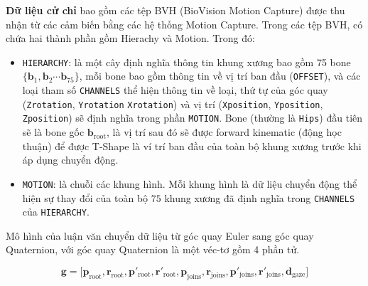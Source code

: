\textbf{Dữ liệu cử chỉ} bao gồm các tệp BVH (BioVision Motion Capture) được thu nhận từ các cảm biến bằng các hệ thống Motion Capture. Trong các tệp BVH, có chứa hai thành phần gồm Hierachy và Motion. Trong đó:

\begin{itemize}
	\item \texttt{HIERARCHY}: là một cây định nghĩa thông tin khung xương bao gồm 75 bone $\{ \mathbf{b}_1, \mathbf{b}_2 \cdots \mathbf{b}_{75} \} $, mỗi bone bao gồm thông tin về vị trí ban đầu (\texttt{OFFSET}), và các loại tham số \texttt{CHANNELS} thể hiện thông tin về loại, thứ tự của góc quay (\texttt{Zrotation}, \texttt{Yrotation} \texttt{Xrotation}) và vị trí (\texttt{Xposition}, \texttt{Yposition}, \texttt{Zposition}) sẽ định nghĩa trong phần \texttt{MOTION}. Bone (thường là \texttt{Hips}) đầu tiên sẽ là bone gốc $\mathbf{b}_{\text{root}}$, là vị trí sau đó sẽ được forward kinematic (động học thuận) để được T-Shape là ví trí ban đầu của toàn bộ khung xương trước khi áp dụng chuyển động.
	
	\item \texttt{MOTION}: là chuỗi các khung hình. Mỗi khung hình là dữ liệu chuyển động thể hiện sự thay đổi của toàn bộ $75$ khung xương đã định nghĩa trong \texttt{CHANNELS} của \texttt{HIERARCHY}.
\end{itemize}


Mô hình của luận văn chuyển dữ liệu từ góc quay Euler sang góc quay Quaternion, với góc quay Quaternion là một véc-tơ gồm 4 phần tử.

\begin{equation} \label{eq:gesturevector}
	\mathbf{g} = \Big[ \mathbf{p}_{\text{root}},  \mathbf{r}_{\text{root}},
	\mathbf{ p }'_{\text{root}},  \mathbf{r}'_{\text{root}},
	\mathbf{p}_{\text{joins}},  \mathbf{r}_{\text{joins}},
	\mathbf{p}'_{\text{joins}},  \mathbf{r}'_{\text{joins}},
	\mathbf{d}_{\text{gaze}}
	\Big]
\end{equation}

